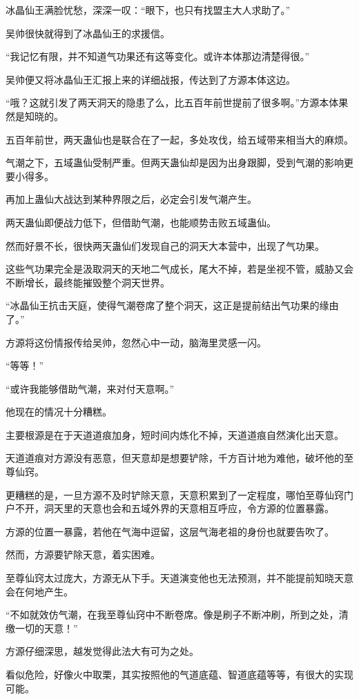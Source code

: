 \begin{this_body}
冰晶仙王满脸忧愁，深深一叹：“眼下，也只有找盟主大人求助了。”

吴帅很快就得到了冰晶仙王的求援信。

“我记忆有限，并不知道气功果还有这等变化。或许本体那边清楚得很。”

吴帅便又将冰晶仙王汇报上来的详细战报，传达到了方源本体这边。

“哦？这就引发了两天洞天的隐患了么，比五百年前世提前了很多啊。”方源本体果然是知晓的。

五百年前世，两天蛊仙也是联合在了一起，多处攻伐，给五域带来相当大的麻烦。

气潮之下，五域蛊仙受制严重。但两天蛊仙却是因为出身跟脚，受到气潮的影响更要小得多。

再加上蛊仙大战达到某种界限之后，必定会引发气潮产生。

两天蛊仙即便战力低下，但借助气潮，也能顺势击败五域蛊仙。

然而好景不长，很快两天蛊仙们发现自己的洞天大本营中，出现了气功果。

这些气功果完全是汲取洞天的天地二气成长，尾大不掉，若是坐视不管，威胁又会不断增长，最终能摧毁整个洞天世界。

“冰晶仙王抗击天庭，使得气潮卷席了整个洞天，这正是提前结出气功果的缘由了。”

方源将这份情报传给吴帅，忽然心中一动，脑海里灵感一闪。

“等等！”

“或许我能够借助气潮，来对付天意啊。”

他现在的情况十分糟糕。

主要根源是在于天道道痕加身，短时间内炼化不掉，天道道痕自然演化出天意。

天道道痕对方源没有恶意，但天意却是想要铲除，千方百计地为难他，破坏他的至尊仙窍。

更糟糕的是，一旦方源不及时铲除天意，天意积累到了一定程度，哪怕至尊仙窍门户不开，洞天里的天意也会和五域外界的天意相互呼应，令方源的位置暴露。

方源的位置一暴露，若他在气海中逗留，这层气海老祖的身份也就要告吹了。

然而，方源要铲除天意，着实困难。

至尊仙窍太过庞大，方源无从下手。天道演变他也无法预测，并不能提前知晓天意会在何地产生。

“不如就效仿气潮，在我至尊仙窍中不断卷席。像是刷子不断冲刷，所到之处，清缴一切的天意！”

方源仔细深思，越发觉得此法大有可为之处。

看似危险，好像火中取栗，其实按照他的气道底蕴、智道底蕴等等，有很大的实现可能。


\end{this_body}
